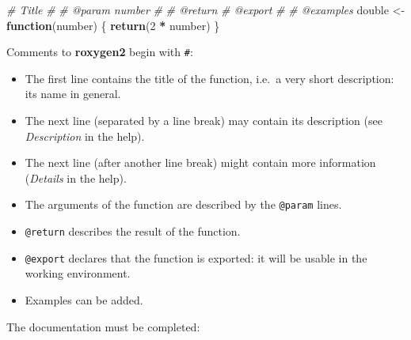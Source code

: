 \documentclass[
  12pt,
  american,
  a4paper,
  extrafontsizes,onecolumn,openright
  ]{memoir}
\newenvironment{Shaded}{\begin{snugshade}}{\end{snugshade}}
\newcommand{\CommentTok}[1]{\textcolor[rgb]{0.56,0.35,0.01}{\textit{#1}}}
\newcommand{\ControlFlowTok}[1]{\textcolor[rgb]{0.13,0.29,0.53}{\textbf{#1}}}
\newcommand{\DecValTok}[1]{\textcolor[rgb]{0.00,0.00,0.81}{#1}}
\newcommand{\FunctionTok}[1]{\textcolor[rgb]{0.13,0.29,0.53}{\textbf{#1}}}
\newcommand{\NormalTok}[1]{#1}
\newcommand{\OtherTok}[1]{\textcolor[rgb]{0.56,0.35,0.01}{#1}}
\newcommand{\SpecialCharTok}[1]{\textcolor[rgb]{0.81,0.36,0.00}{\textbf{#1}}}
\providecommand{\tightlist}{%
  \setlength{\itemsep}{0pt}\setlength{\parskip}{0pt}}
\begin{document}
\scriptsize

\begin{Shaded}
\begin{Highlighting}[]
\CommentTok{\#\textquotesingle{} Title}
\CommentTok{\#\textquotesingle{}}
\CommentTok{\#\textquotesingle{} @param number }
\CommentTok{\#\textquotesingle{}}
\CommentTok{\#\textquotesingle{} @return}
\CommentTok{\#\textquotesingle{} @export}
\CommentTok{\#\textquotesingle{}}
\CommentTok{\#\textquotesingle{} @examples}
\NormalTok{double }\OtherTok{\textless{}{-}} \ControlFlowTok{function}\NormalTok{(number) \{}
    \FunctionTok{return}\NormalTok{(}\DecValTok{2} \SpecialCharTok{*}\NormalTok{ number)}
\NormalTok{\}}
\end{Highlighting}
\end{Shaded}

\normalsize

Comments to \textbf{roxygen2} begin with \texttt{\#\textquotesingle{}}:

\begin{itemize}
\tightlist
\item
  The first line contains the title of the function, i.e.~a very short description: its name in general.
\item
  The next line (separated by a line break) may contain its description (see \emph{Description} in the help).
\item
  The next line (after another line break) might contain more information (\emph{Details} in the help).
\item
  The arguments of the function are described by the \texttt{@param} lines.
\item
  \texttt{@return} describes the result of the function.
\item
  \texttt{@export} declares that the function is exported: it will be usable in the working environment.
\item
  Examples can be added.
\end{itemize}

The documentation must be completed:

\scriptsize
\end{document}
